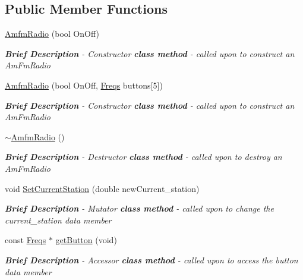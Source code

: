 \subsection*{Public Member Functions}
\begin{DoxyCompactItemize}
\item 
\hyperlink{class_amfm_radio_a2a1975e80966c8a7d20f66a334ffc3f1}{Amfm\-Radio} (bool On\-Off)
\begin{DoxyCompactList}\small\item\em {\bfseries Brief Description} -\/ Constructor {\bfseries {\itshape class method}} -\/ called upon to construct an Am\-Fm\-Radio \end{DoxyCompactList}\item 
\hyperlink{class_amfm_radio_a41de9877eceb20456999245388443c03}{Amfm\-Radio} (bool On\-Off, \hyperlink{struct_freqs}{Freqs} buttons\mbox{[}5\mbox{]})
\begin{DoxyCompactList}\small\item\em {\bfseries Brief Description} -\/ Constructor {\bfseries {\itshape class method}} -\/ called upon to construct an Am\-Fm\-Radio \end{DoxyCompactList}\item 
\hyperlink{class_amfm_radio_a6d986369cedb589fb368651ea5d56555}{$\sim$\-Amfm\-Radio} ()
\begin{DoxyCompactList}\small\item\em {\bfseries Brief Description} -\/ Destructor {\bfseries {\itshape class method}} -\/ called upon to destroy an Am\-Fm\-Radio \end{DoxyCompactList}\item 
void \hyperlink{class_amfm_radio_a1174276a1894f9b96f2d9aaa7bd6f273}{Set\-Current\-Station} (double new\-Current\-\_\-station)
\begin{DoxyCompactList}\small\item\em {\bfseries Brief Description} -\/ Mutator {\bfseries {\itshape class method}} -\/ called upon to change the current\-\_\-station data member \end{DoxyCompactList}\item 
const \hyperlink{struct_freqs}{Freqs} $\ast$ \hyperlink{class_amfm_radio_a173efccf38cc120f2badc058fa9287cc}{get\-Button} (void)
\begin{DoxyCompactList}\small\item\em {\bfseries Brief Description} -\/ Accessor {\bfseries {\itshape class method}} -\/ called upon to access the button data member \end{DoxyCompactList}\item 

\end{DoxyCompactItemize}

